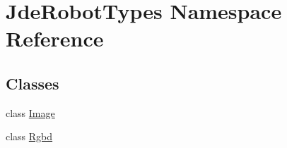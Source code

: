 \hypertarget{namespace_jde_robot_types}{}\section{Jde\+Robot\+Types Namespace Reference}
\label{namespace_jde_robot_types}
\subsection*{Classes}
\begin{DoxyCompactItemize}
\item 
class \hyperlink{class_jde_robot_types_1_1_image}{Image}
\item 
class \hyperlink{class_jde_robot_types_1_1_rgbd}{Rgbd}
\end{DoxyCompactItemize}
